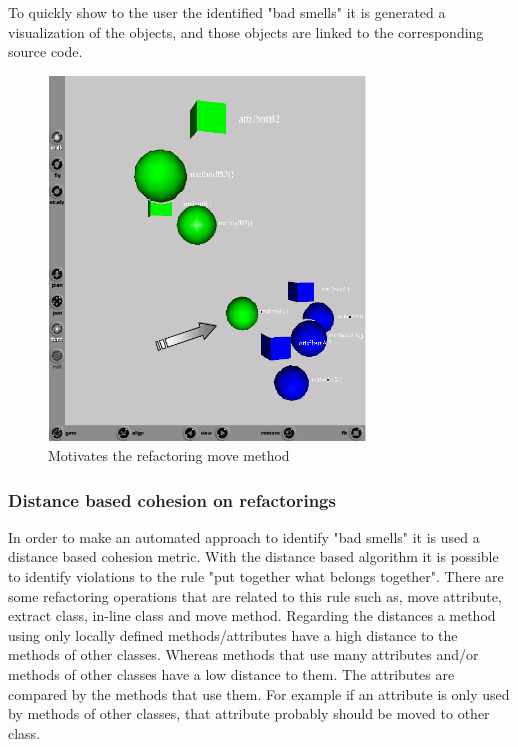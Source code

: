 To quickly show to the user the identified "bad smells" it is generated a visualization of the objects, and those objects are linked to the corresponding source code. 

\begin{figure}[h!]
  \centering
  \includegraphics[width=0.75\textwidth]{img/metricsbasedrefactoring.png}
  \caption{Motivates the refactoring move method}
  \label{fig:MetricsBasedRefactoring}
\end{figure}



\subsubsection{Distance based cohesion on refactorings}
In order to make an automated approach to identify "bad smells" it is used a distance based cohesion metric.
With the distance based algorithm it is possible to identify violations to the rule "put together what belongs together". 
There are some refactoring operations that are related to this rule such as, move attribute, extract class, in-line class and move method. 
Regarding the distances a method using only locally defined methods/attributes have a high distance to the methods of other classes. 
Whereas methods that use many attributes and/or methods of other classes have a low distance to them. 
The attributes are compared by the methods that use them. 
For example if an attribute is only used by methods of other classes, that attribute probably should be moved to other class.


